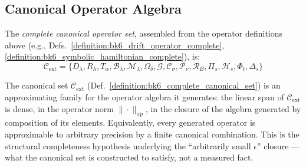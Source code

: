 \subsection{Canonical Operator Algebra}
\label{subsec:bk6_canonical_operator_algebra}

\begin{definition}
\label{definition:bk6_complete_canonical_set}
The \emph{complete canonical operator set}, assembled from the operator definitions above (e.g., Defs.~\ref{definition:bk6_drift_operator_complete}, \ref{definition:bk6_symbolic_hamiltonian_complete}), is:
\begin{equation}
\mathcal{C}_{\text{ext}} = \{D_\lambda, R_\lambda, T_\alpha, \mathcal{B}_\lambda, \mathcal{M}_\lambda, \Omega_\delta, \mathcal{G}, \mathcal{C}_\sigma, \mathcal{P}_\nu, \mathcal{R}_B, \Pi_s, \mathcal{H}_s, \Phi_t, \Delta_s\}
\end{equation}
\end{definition}

\begin{assumption}
\label{assumption:bk6_canonical_density}
The canonical set $\mathcal{C}_{\text{ext}}$ (Def.~\ref{definition:bk6_complete_canonical_set}) is an approximating family for the operator algebra it generates: the linear span of $\mathcal{C}_{\text{ext}}$ is dense, in the operator norm $\|\cdot\|_{\text{op}}$, in the closure of the algebra generated by composition of its elements. Equivalently, every generated operator is approximable to arbitrary precision by a finite canonical combination. This is the structural completeness hypothesis underlying the ``arbitrarily small $\epsilon$'' closure --- what the canonical set is constructed to satisfy, not a measured fact.
\end{assumption}


